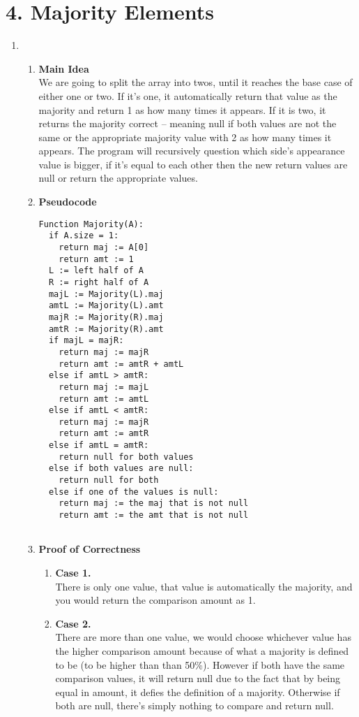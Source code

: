 \documentclass[11pt]{article}
\newenvironment{qparts}{\begin{enumerate}[{(}a{)}]}{\end{enumerate}}
\begin{document}
\section*{4. Majority Elements}
\begin{qparts}
	\item 
	\begin{qparts}
	\item[] \textbf{Main Idea} \\
		 We are going to split the array into twos, until it reaches the base case of either one or two. If it's one, it automatically return that value as the majority and return 1 as how many times it appears. If it is two, it returns the majority correct -- meaning null if both values are not the same or the appropriate majority value with 2 as how many times it appears. The program will recursively question which side's appearance value is bigger, if it's equal to each other then the new return values are null or return the appropriate values.
	\item[] \textbf{Pseudocode} \\
		\begin{minipage}{\linewidth}
		\begin{lstlisting}
Function Majority(A):
  if A.size = 1:
    return maj := A[0]
    return amt := 1
  L := left half of A
  R := right half of A
  majL := Majority(L).maj
  amtL := Majority(L).amt
  majR := Majority(R).maj
  amtR := Majority(R).amt
  if majL = majR:
    return maj := majR
    return amt := amtR + amtL
  else if amtL > amtR:
    return maj := majL
    return amt := amtL
  else if amtL < amtR:
    return maj := majR
    return amt := amtR
  else if amtL = amtR:
    return null for both values
  else if both values are null:
    return null for both
  else if one of the values is null:
    return maj := the maj that is not null
    return amt := the amt that is not null
  
		\end{lstlisting}
		\end{minipage}
		
	\item[] \textbf{Proof of Correctness} 
	\begin{qparts}
		\item[] \textbf{Case 1.} \\
		There is only one value, that value is automatically the majority, and you would return the comparison amount as 1. 
		\item[] \textbf{Case 2.}	 \\
		There are more than one value, we would choose whichever value has the higher comparison amount because of what a majority is defined to be (to be higher than than 50\%). However if both have the same comparison values, it will return null due to the fact that by being equal in amount, it defies the definition of a majority. Otherwise if both are null, there's simply nothing to compare and return null.
		

\end{qparts}
\end{qparts}
\end{qparts}
\end{document}
